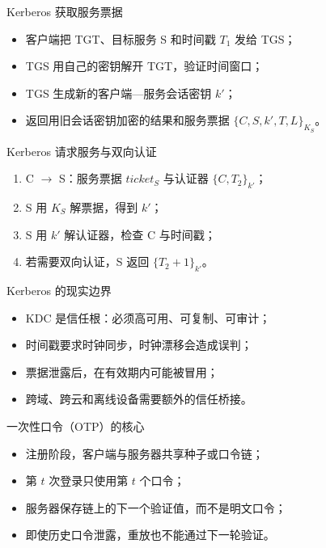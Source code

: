 \documentclass[UTF8,fontset=none,aspectratio=169,10pt]{beamer}
\begin{document}
\begin{frame}{Kerberos 获取服务票据}
\begin{itemize}
  \item 客户端把 TGT、目标服务 S 和时间戳 $T_1$ 发给 TGS；
  \item TGS 用自己的密钥解开 TGT，验证时间窗口；
  \item TGS 生成新的客户端—服务会话密钥 $k'$；
  \item 返回用旧会话密钥加密的结果和服务票据 $\{C,S,k',T,L\}_{K_S}$。
\end{itemize}
\end{frame}

\begin{frame}{Kerberos 请求服务与双向认证}
\begin{enumerate}
  \item C $\rightarrow$ S：服务票据 $ticket_S$ 与认证器 $\{C,T_2\}_{k'}$；
  \item S 用 $K_S$ 解票据，得到 $k'$；
  \item S 用 $k'$ 解认证器，检查 C 与时间戳；
  \item 若需要双向认证，S 返回 $\{T_2+1\}_{k'}$。
\end{enumerate}
\vfill
{}
\end{frame}

\begin{frame}{Kerberos 的现实边界}
\begin{itemize}
  \item KDC 是信任根：必须高可用、可复制、可审计；
  \item 时间戳要求时钟同步，时钟漂移会造成误判；
  \item 票据泄露后，在有效期内可能被冒用；
  \item 跨域、跨云和离线设备需要额外的信任桥接。
\end{itemize}
\end{frame}


\begin{frame}{一次性口令（OTP）的核心}
\begin{itemize}
  \item 注册阶段，客户端与服务器共享种子或口令链；
  \item 第 $t$ 次登录只使用第 $t$ 个口令；
  \item 服务器保存链上的下一个验证值，而不是明文口令；
  \item 即使历史口令泄露，重放也不能通过下一轮验证。
\end{itemize}
\end{frame}
\end{document}
